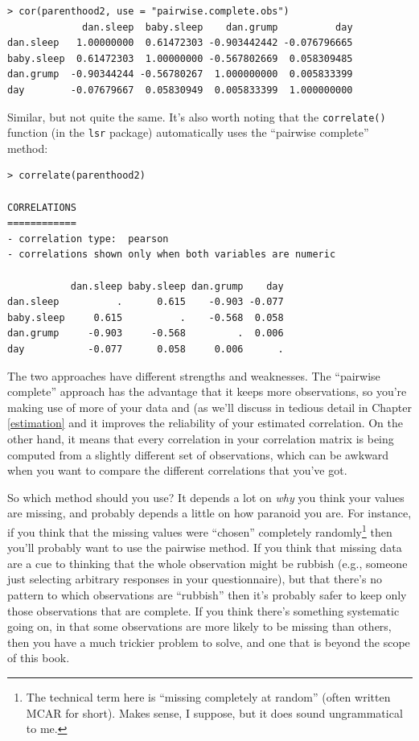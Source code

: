 \documentclass[
]{book}
\begin{document}
\begin{verbatim}
> cor(parenthood2, use = "pairwise.complete.obs") 
             dan.sleep  baby.sleep    dan.grump          day
dan.sleep   1.00000000  0.61472303 -0.903442442 -0.076796665
baby.sleep  0.61472303  1.00000000 -0.567802669  0.058309485
dan.grump  -0.90344244 -0.56780267  1.000000000  0.005833399
day        -0.07679667  0.05830949  0.005833399  1.000000000
\end{verbatim}

Similar, but not quite the same. It's also worth noting that the \texttt{correlate()} function (in the \texttt{lsr} package) automatically uses the ``pairwise complete'' method:

\begin{verbatim}
> correlate(parenthood2)

CORRELATIONS
============
- correlation type:  pearson 
- correlations shown only when both variables are numeric

           dan.sleep baby.sleep dan.grump    day
dan.sleep          .      0.615    -0.903 -0.077
baby.sleep     0.615          .    -0.568  0.058
dan.grump     -0.903     -0.568         .  0.006
day           -0.077      0.058     0.006      .
\end{verbatim}

The two approaches have different strengths and weaknesses. The ``pairwise complete'' approach has the advantage that it keeps more observations, so you're making use of more of your data and (as we'll discuss in tedious detail in Chapter \ref{estimation} and it improves the reliability of your estimated correlation. On the other hand, it means that every correlation in your correlation matrix is being computed from a slightly different set of observations, which can be awkward when you want to compare the different correlations that you've got.

So which method should you use? It depends a lot on \emph{why} you think your values are missing, and probably depends a little on how paranoid you are. For instance, if you think that the missing values were ``chosen'' completely randomly\footnote{The technical term here is ``missing completely at random'' (often written MCAR for short). Makes sense, I suppose, but it does sound ungrammatical to me.} then you'll probably want to use the pairwise method. If you think that missing data are a cue to thinking that the whole observation might be rubbish (e.g., someone just selecting arbitrary responses in your questionnaire), but that there's no pattern to which observations are ``rubbish'' then it's probably safer to keep only those observations that are complete. If you think there's something systematic going on, in that some observations are more likely to be missing than others, then you have a much trickier problem to solve, and one that is beyond the scope of this book.
\end{document}
